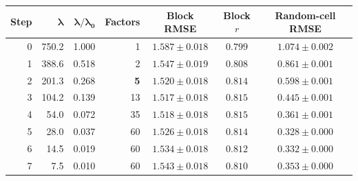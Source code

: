 \begin{tabular}{@{}rrrrccc@{}}
\toprule
\textbf{Step} & $\boldsymbol{\lambda}$ & $\boldsymbol{\lambda/\lambda_0}$ & \textbf{Factors} & \textbf{Block RMSE} & \textbf{Block $r$} & \textbf{Random-cell RMSE} \\
\midrule
0 & 750.2 & 1.000 & 1 & $1.587 \pm 0.018$ & $0.799$ & $1.074 \pm 0.002$ \\
1 & 388.6 & 0.518 & 2 & $1.547 \pm 0.019$ & $0.808$ & $0.861 \pm 0.001$ \\
2 & 201.3 & 0.268 & \textbf{5} & $1.520 \pm 0.018$ & $0.814$ & $0.598 \pm 0.001$ \\
3 & 104.2 & 0.139 & 13 & $1.517 \pm 0.018$ & $0.815$ & $0.445 \pm 0.001$ \\
4 &  54.0 & 0.072 & 35 & $1.518 \pm 0.018$ & $0.815$ & $0.361 \pm 0.001$ \\
5 &  28.0 & 0.037 & 60 & $1.526 \pm 0.018$ & $0.814$ & $0.328 \pm 0.000$ \\
6 &  14.5 & 0.019 & 60 & $1.534 \pm 0.018$ & $0.812$ & $0.332 \pm 0.000$ \\
7 &   7.5 & 0.010 & 60 & $1.543 \pm 0.018$ & $0.810$ & $0.353 \pm 0.000$ \\
\bottomrule
\end{tabular}
